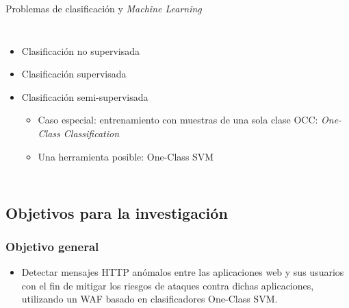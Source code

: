 \begin{frame}
\begin{exampleblock}{Problemas de clasificación y \textit{Machine Learning}}
\begin{columns}
            \begin{itemize}[<+(1)->]
                \item
                Clasificación no supervisada

                \item
                Clasificación supervisada

                \item
                Clasificación semi-supervisada

                \begin{itemize}[<.->]
                    \item
                    Caso especial: entrenamiento con muestras de una sola clase
                    OCC: \textit{One-Class Classification}

                    \item
                    Una herramienta posible: One-Class SVM
                \end{itemize}
            \end{itemize}
        \end{columns}
    \end{exampleblock}
\end{frame}



\subsection{Objetivos para la investigación}

\begin{frame}
    \frametitle{Objetivo general}

    \begin{itemize}[<+(1)->]
        \item
        Detectar mensajes HTTP anómalos entre las aplicaciones web y
        sus usuarios con el fin de mitigar los riesgos de ataques contra
        dichas aplicaciones, utilizando un WAF basado en clasificadores
        One-Class SVM.
    \end{itemize}
\end{frame}


